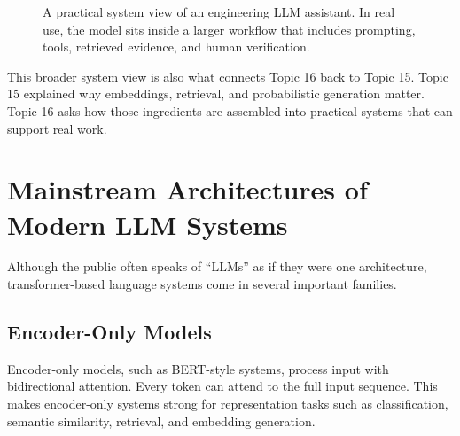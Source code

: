 \documentclass[12pt]{article}
\begin{document}
\begin{figure}[ht]
    \centering
    \caption{A practical system view of an engineering LLM assistant. In real use, the model sits inside a larger workflow that includes prompting, tools, retrieved evidence, and human verification.}
    \label{t16fig:system_stack}
\end{figure}

This broader system view is also what connects Topic 16 back to Topic 15. Topic 15 explained why embeddings, retrieval, and probabilistic generation matter. Topic 16 asks how those ingredients are assembled into practical systems that can support real work.

\section{Mainstream Architectures of Modern LLM Systems}

Although the public often speaks of ``LLMs'' as if they were one architecture, transformer-based language systems come in several important families.

\subsection{Encoder-Only Models}

Encoder-only models, such as BERT-style systems, process input with bidirectional attention. Every token can attend to the full input sequence. This makes encoder-only systems strong for representation tasks such as classification, semantic similarity, retrieval, and embedding generation.
\end{document}
